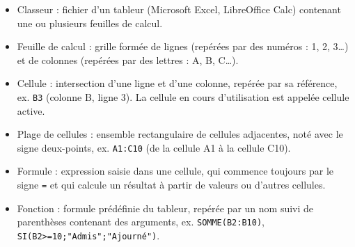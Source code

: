 \documentclass[11pt]{article}
\newcommand{\cle}[1]{{\popxbold\color{popdark}#1}}
\begin{document}
\begin{aretenir}
\begin{itemize}
  \item \cle{Classeur} : fichier d'un tableur (Microsoft Excel, LibreOffice Calc) contenant une ou plusieurs \cle{feuilles de calcul}.
  \item \cle{Feuille de calcul} : grille formée de lignes (repérées par des numéros : 1, 2, 3\ldots) et de colonnes (repérées par des lettres : A, B, C\ldots).
  \item \cle{Cellule} : intersection d'une ligne et d'une colonne, repérée par sa référence, ex. \texttt{B3} (colonne B, ligne 3). La cellule en cours d'utilisation est appelée \cle{cellule active}.
  \item \cle{Plage de cellules} : ensemble rectangulaire de cellules adjacentes, noté avec le signe deux-points, ex. \texttt{A1:C10} (de la cellule A1 à la cellule C10).
  \item \cle{Formule} : expression saisie dans une cellule, qui commence toujours par le signe \texttt{=} et qui calcule un résultat à partir de valeurs ou d'autres cellules.
  \item \cle{Fonction} : formule prédéfinie du tableur, repérée par un nom suivi de parenthèses contenant des arguments, ex. \texttt{SOMME(B2:B10)}, \texttt{SI(B2>=10;"Admis";"Ajourné")}.
\end{itemize}
\end{aretenir}
\end{document}
